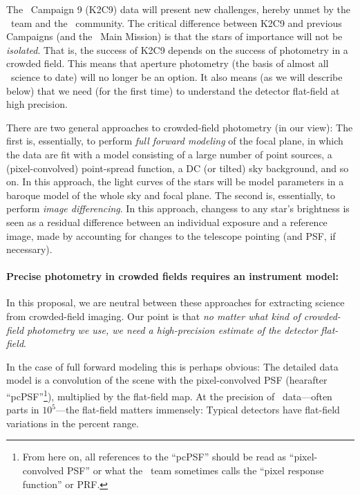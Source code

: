 \documentclass[12pt,preprint]{aastex}
\begin{document}
The \ktwo\ Campaign 9 (K2C9) data will present new challenges, hereby
unmet by the \ktwo\ team and the \kepler\ community.
The critical difference between K2C9 and previous Campaigns (and the
\kepler\ Main Mission) is that the stars of importance will not be
\emph{isolated}.
That is, the success of K2C9 depends on the success of photometry in a
crowded field.
This means that aperture photometry (the basis of almost all
\kepler\ science to date) will no longer be an option.
It also means (as we will describe below) that we need (for the first
time) to understand the detector flat-field at high precision.

There are two general approaches to crowded-field photometry (in our view):
The first is, essentially, to perform \emph{full forward modeling} of the
focal plane, in which the data are fit with a model consisting of a
large number of point sources, a (pixel-convolved) point-spread
function, a DC (or tilted) sky background, and so on.
In this approach, the light curves of the stars will be model parameters
in a baroque model of the whole sky and focal plane.
The second is, essentially, to perform \emph{image differencing}.
In this approach, changess to any star's brightness is seen as a
residual difference between an individual exposure and a reference
image, made by accounting for changes to the telescope pointing (and
PSF, if necessary).

\paragraph{Precise photometry in crowded fields requires an instrument model:}

In this proposal, we are neutral between these approaches for extracting
science from crowded-field imaging.
Our point is that \emph{no matter what kind of crowded-field photometry
we use, we need a high-precision estimate of the detector flat-field}.

In the case of full forward modeling this is perhaps obvious:
The detailed data model is a convolution of the scene with the
pixel-convolved PSF (hearafter ``pcPSF''\footnote{From here on, all references to the
  ``pcPSF'' should be read as ``pixel-convolved PSF'' or what the
  \kepler\ team sometimes calls the ``pixel response function'' or
  PRF.}), multiplied by the flat-field map.
At the precision of \kepler\ data---often parts in $10^5$---the
flat-field matters immensely:
Typical detectors have flat-field variations in the percent range.
\end{document}
